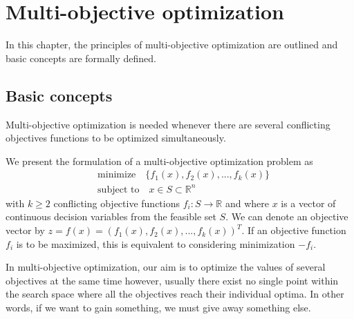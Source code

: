 \chapter{Multi-objective optimization}
\label{chapter:multiobjective}
In this chapter, the principles of multi-objective optimization are outlined and basic concepts are formally defined.

\section{Basic concepts}
Multi-objective optimization is needed whenever there are several conflicting objectives functions to be optimized simultaneously.

We present the formulation of a multi-objective optimization problem as
\begin{equation}
\label{fun:mop}
\begin{split}
&\text{minimize} \quad \{ f_{1}(x), f_{2}(x),..., f_{k}(x) \} \\
&\text{subject to} \quad x \in S \subset \mathbb{R}^{n}
\end{split}
\end{equation}
with $k\geq 2$ conflicting objective functions $f_{i}: S \rightarrow \mathbb{R} $ and where $x$ is a vector of continuous decision variables from the feasible set $S$. We can denote an objective vector by $z = f(x) = (f_{1}(x), f_{2}(x),..., f_{k}(x))^{T}$.  
If an objective function $ f_{i}$ is to be maximized, this is equivalent to considering minimization $-f_{i}$.

In multi-objective optimization, our aim is to optimize the values of several objectives at the same time however, usually there exist no single point within the search space where all the objectives reach their individual optima. In other words, if we want to gain something, we must give away something else.

